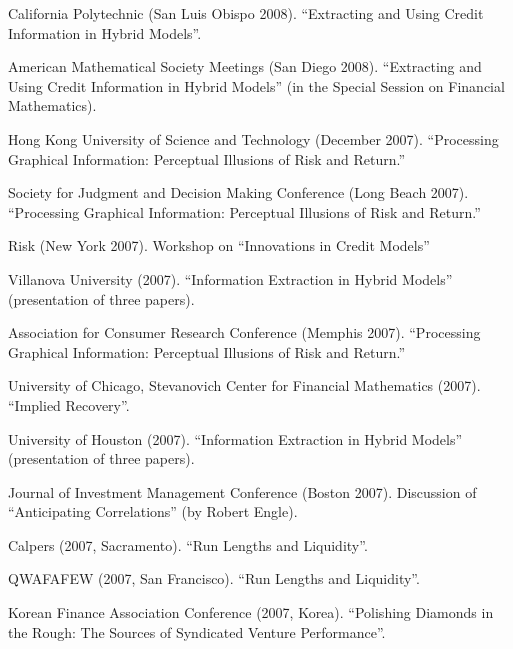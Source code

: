 \documentclass{article}
\begin{document}
\begin{etaremune}
{\item California Polytechnic (San Luis Obispo 2008). 
``Extracting and Using Credit Information in Hybrid Models''.

\item American Mathematical Society Meetings (San Diego 2008).
``Extracting and Using Credit Information in Hybrid Models'' (in the Special Session 
on Financial Mathematics). 

\item Hong Kong University of Science and Technology (December 2007). 
``Processing Graphical Information: Perceptual Illusions of Risk and Return.''

\item Society for Judgment and Decision Making Conference (Long Beach 2007). 
``Processing Graphical Information: Perceptual Illusions of Risk and Return.''

\item Risk (New York 2007). 
Workshop on ``Innovations in Credit Models''

\item Villanova University (2007). 
``Information Extraction in Hybrid Models'' (presentation of three papers). 

\item Association for Consumer Research Conference (Memphis 2007). 
``Processing Graphical Information: Perceptual Illusions of Risk and Return.''

\item University of Chicago, Stevanovich Center for Financial Mathematics (2007).
``Implied Recovery''. 

\item University of Houston (2007). 
``Information Extraction in Hybrid Models'' (presentation of three papers). 

\item Journal of Investment Management Conference (Boston 2007). 
Discussion of ``Anticipating Correlations'' (by Robert Engle). 

\item Calpers (2007, Sacramento). 
``Run Lengths and Liquidity''.

\item QWAFAFEW (2007, San Francisco). 
``Run Lengths and Liquidity''.

\item Korean Finance Association Conference (2007, Korea). 
``Polishing Diamonds in the Rough: The Sources of Syndicated Venture Performance''. 

}
\end{etaremune}
\end{document}
